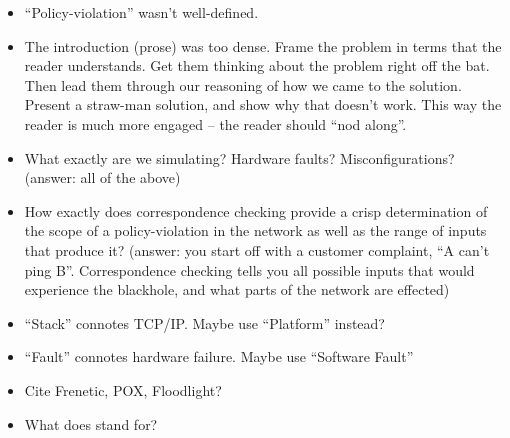 {\begin{itemize}
\item ``Policy-violation'' wasn't well-defined.
\item The introduction (prose) was too dense. Frame the problem in terms that
the reader understands. Get them thinking about the problem right off the bat.
Then lead them through our reasoning of how we came to the solution. Present
a straw-man solution, and show why that doesn't work. This way
the reader is much more engaged -- the reader should ``nod along''.
\item What exactly are we simulating? Hardware faults? Misconfigurations?
(answer: all of the above)
\item How exactly does correspondence checking provide a crisp determination of the scope of a policy-violation in the
network as well as the range of inputs that produce it? (answer: you start off
with a customer complaint, ``A can't ping B''. Correspondence checking tells
you all possible inputs that would experience the blackhole, and what parts of
the network are effected)
\item ``Stack'' connotes TCP/IP. Maybe use ``Platform'' instead?
\item ``Fault'' connotes hardware failure. Maybe use ``Software Fault''
\item Cite Frenetic, POX, Floodlight?
\item What does \projectname{} stand for?
\end{itemize}
}
